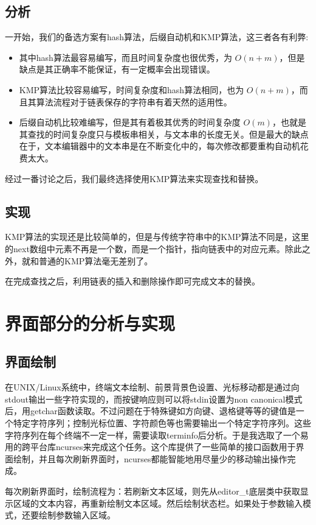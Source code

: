 \documentclass[a4paper,9pt]{article}
\begin{document}
\subsection{分析}
一开始，我们的备选方案有hash算法，后缀自动机和KMP算法，这三者各有利弊: 
\begin{itemize}
	\item{}其中hash算法最容易编写，而且时间复杂度也很优秀，为 $O(n+m)$，但是缺点是其正确率不能保证，有一定概率会出现错误。
	\item{} KMP算法比较容易编写，时间复杂度和hash算法相同，也为 $O(n+m)$，而且其算法流程对于链表保存的字符串有着天然的适用性。
	\item{} 后缀自动机比较难编写，但是其有着极其优秀的时间复杂度 $O(m)$，也就是其查找的时间复杂度只与模板串相关，与文本串的长度无关。但是最大的缺点在于，文本编辑器中的文本串是在不断变化中的，每次修改都要重构自动机花费太大。
\end{itemize}
经过一番讨论之后，我们最终选择使用KMP算法来实现查找和替换。

\subsection{实现}
KMP算法的实现还是比较简单的，但是与传统字符串中的KMP算法不同是，这里的next数组中元素不再是一个数，而是一个指针，指向链表中的对应元素。除此之外，就和普通的KMP算法毫无差别了。

在完成查找之后，利用链表的插入和删除操作即可完成文本的替换。

\section{界面部分的分析与实现}
\subsection{界面绘制}
在UNIX/Linux系统中，终端文本绘制、前景背景色设置、光标移动都是通过向stdout输出一些字符实现的，而按键响应则可以将stdin设置为non canonical模式后，用getchar函数读取。不过问题在于特殊键如方向键、退格键等等的键值是一个特定字符序列；控制光标位置、字符颜色等也需要输出一个特定字符序列。这些字符序列在每个终端不一定一样，需要读取terminfo后分析。于是我选取了一个易用的跨平台库ncurses来完成这个任务。这个库提供了一些简单的接口函数用于界面绘制，并且每次刷新界面时，ncurses都能智能地用尽量少的移动输出操作完成。

每次刷新界面时，绘制流程为：若刷新文本区域，则先从editor\_t底层类中获取显示区域的文本内容，再重新绘制文本区域。然后绘制状态栏。如果处于参数输入模式，还要绘制参数输入区域。
\end{document}
